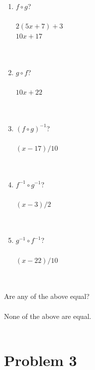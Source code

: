 \documentclass{amsart}
\theoremstyle{definition}
\theoremstyle{Exercise}
\theoremstyle{remark}
\theoremstyle{rule}
\numberwithin{equation}{section}
\begin{document}
\begin{enumerate}[label=(\alph*)]
\item  $f\circ g$?\\\\
$2(5x+7)+3$\\
$10x+17$\\
\\\\
\item  $g \circ f$?\\\\
$10x+22$\\
\\\\
\item  $(f\circ g)^{-1}$?\\\\
$(x-17)/10$\\
\\\\
\item  $f^{-1}\circ g^{-1}$?\\\\
$(x-3)/2$\\
\\\\
\item  $g^{-1}\circ f^{-1}$?\\\\
$(x-22)/10$\\
\\\\
\end{enumerate}
Are any of the above equal?\\\\
None of the above are equal.
\\\\


    \newpage



\section*{Problem 3}
\end{document}

